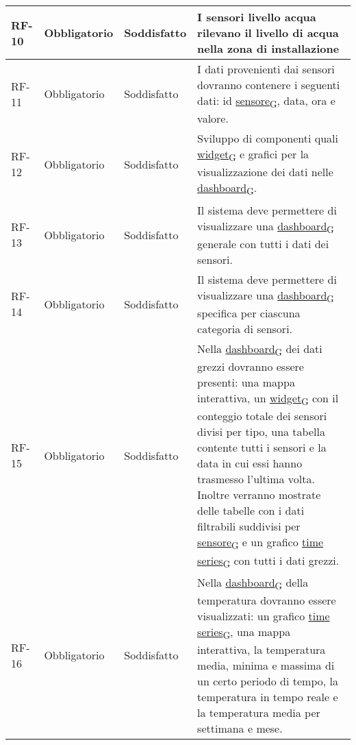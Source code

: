 \begin{longtable}{|>{\centering\arraybackslash}m{}|>{\centering\arraybackslash}m{}|>{\centering\arraybackslash}m{}|>{\centering\arraybackslash}m{}|}
	\\\hline
	RF-10           & Obbligatorio        & Soddisfatto & I sensori livello acqua rilevano il livello di acqua nella zona di installazione
	\\\hline
	RF-11           & Obbligatorio        & Soddisfatto & I dati provenienti dai sensori dovranno contenere i seguenti dati: id \href{https://7last.github.io/docs/rtb/documentazione-interna/glossario\#sensore}{sensore\textsubscript{G}}, data, ora e valore.
	\\\hline
	RF-12           & Obbligatorio        & Soddisfatto & Sviluppo di componenti quali \href{https://7last.github.io/docs/rtb/documentazione-interna/glossario\#widget}{widget\textsubscript{G}} e grafici per la visualizzazione dei dati nelle \href{https://7last.github.io/docs/rtb/documentazione-interna/glossario\#dashboard}{dashboard\textsubscript{G}}.
	\\\hline
	RF-13           & Obbligatorio        & Soddisfatto                                                                                                           & Il sistema deve permettere di visualizzare una \href{https://7last.github.io/docs/rtb/documentazione-interna/glossario\#dashboard}{dashboard\textsubscript{G}} generale con tutti i dati dei sensori.
	\\\hline
	RF-14           & Obbligatorio        & Soddisfatto & Il sistema deve permettere di visualizzare una \href{https://7last.github.io/docs/rtb/documentazione-interna/glossario\#dashboard}{dashboard\textsubscript{G}} specifica per ciascuna categoria di sensori.
	\\\hline
	RF-15           & Obbligatorio        & Soddisfatto & Nella \href{https://7last.github.io/docs/rtb/documentazione-interna/glossario\#dashboard}{dashboard\textsubscript{G}} dei dati grezzi dovranno essere presenti: una mappa interattiva, un \href{https://7last.github.io/docs/rtb/documentazione-interna/glossario\#widget}{widget\textsubscript{G}} con il conteggio totale dei sensori divisi per tipo, una tabella contente tutti i sensori e la data in cui essi hanno trasmesso l'ultima volta. Inoltre verranno mostrate delle tabelle con i dati filtrabili suddivisi per \href{https://7last.github.io/docs/rtb/documentazione-interna/glossario\#sensore}{sensore\textsubscript{G}} e un grafico \href{https://7last.github.io/docs/rtb/documentazione-interna/glossario\#time-series}{time series\textsubscript{G}} con tutti i dati grezzi.
	\\\hline
	RF-16           & Obbligatorio        & Soddisfatto & Nella \href{https://7last.github.io/docs/rtb/documentazione-interna/glossario\#dashboard}{dashboard\textsubscript{G}} della temperatura dovranno essere visualizzati: un grafico \href{https://7last.github.io/docs/rtb/documentazione-interna/glossario\#time-series}{time series\textsubscript{G}}, una mappa interattiva, la temperatura media, minima e massima di un certo periodo di tempo, la temperatura in tempo reale e la temperatura media per settimana e mese.

\end{longtable}

